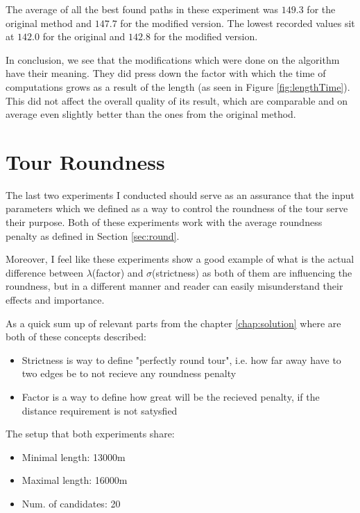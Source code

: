 \documentclass{ctuthesis}
\begin{document}
The average of all the best found paths in these experiment was \(149.3\) for the original method and \(147.7\) for the modified version. The lowest recorded values sit at \(142.0\) for the original and \(142.8\) for the modified version. \par
In conclusion, we see that the modifications which were done on the algorithm have their meaning. They did press down the factor with which the time of computations grows as a result of the length (as seen in Figure \ref{fig:lengthTime}). This did not affect the overall quality of its result, which are comparable and on average even slightly better than the ones from the original method.

\section{Tour Roundness} \label{sec:testRound}
The last two experiments I conducted should serve as an assurance that the input parameters which we defined as a way to control the roundness of the tour serve their purpose. Both of these experiments work with the average roundness penalty as defined in Section \ref{sec:round}. \par
Moreover, I feel like these experiments show a good example of what is the actual difference between \(\lambda\)(factor) and \(\sigma\)(strictness) as both of them are influencing the roundness, but in a different manner and reader can easily misunderstand their effects and importance. \par
As a quick sum up of relevant parts from the chapter \ref{chap:solution} where are both of these concepts described:
\begin{itemize}
\item Strictness is way to define "perfectly round tour", i.e. how far away have to two edges be to not recieve any roundness penalty
\item Factor is a way to define how great will be the recieved penalty, if the distance requirement is not satysfied 
\end{itemize}

\begin{minipage}[t]{0.9\textwidth}
The setup that both experiments share:
\begin{itemize}
  \item Minimal length: 13000m
  \item Maximal length: 16000m
  \item Num. of candidates: 20
\end{itemize}
\end{minipage}
\end{document}

